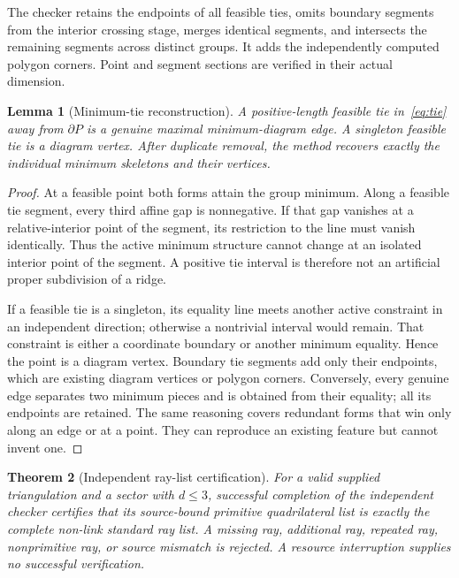 \documentclass[11pt,letterpaper]{article}
\newtheorem{theorem}{Theorem}[section]
\newtheorem{lemma}[theorem]{Lemma}
\theoremstyle{definition}
\theoremstyle{remark}\newtheorem{remark}[theorem]{Remark}
\begin{document}
The checker retains the endpoints of all feasible ties, omits boundary
segments from the interior crossing stage, merges identical segments,
and intersects the remaining segments across distinct groups. It adds
the independently computed polygon corners. Point and segment sections
are verified in their actual dimension.

\begin{lemma}[Minimum-tie reconstruction]
\label{lem:tie}
A positive-length feasible tie in~\eqref{eq:tie} away from $\partial P$
is a genuine maximal minimum-diagram edge. A singleton feasible tie is a
diagram vertex. After duplicate removal, the method recovers exactly the
individual minimum skeletons and their vertices.
\end{lemma}

\begin{proof}
At a feasible point both forms attain the group minimum. Along a feasible
tie segment, every third affine gap is nonnegative. If that gap vanishes
at a relative-interior point of the segment, its restriction to the line
must vanish identically. Thus the active minimum structure cannot change
at an isolated interior point of the segment. A positive tie interval is
therefore not an artificial proper subdivision of a ridge.

If a feasible tie is a singleton, its equality line meets another active
constraint in an independent direction; otherwise a nontrivial interval
would remain. That constraint is either a coordinate boundary or another
minimum equality. Hence the point is a diagram vertex. Boundary tie
segments add only their endpoints, which are existing diagram vertices
or polygon corners. Conversely, every genuine edge separates two minimum
pieces and is obtained from their equality; all its endpoints are retained.
The same reasoning covers redundant forms that win only along an edge
or at a point. They can reproduce an existing feature but cannot invent one.
\end{proof}

\begin{theorem}[Independent ray-list certification]
\label{thm:checker}
For a valid supplied triangulation and a sector with $d\le3$, successful
completion of the independent checker certifies that its source-bound
primitive quadrilateral list is exactly the complete non-link standard
ray list. A missing ray, additional ray, repeated ray, nonprimitive ray,
or source mismatch is rejected. A resource interruption supplies no
successful verification.
\end{theorem}
\end{document}

